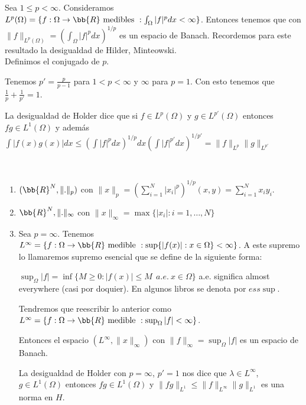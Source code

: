 \begin{ejemplo}
    Sea $1 \leq p < \infty$. Consideramos $L^p(\Omega) = \{f: \Omega \to \bb{R} \text{ medibles } : \int_\Omega |f|^p dx < \infty\}$. Entonces tenemos que con $\|f\|_{L^p(\Omega)} = (\int_\Omega |f|^p dx )^{1/p}$ es un espacio de Banach. Recordemos para este resultado la desigualdad de Hilder, Minteowski.\\

    Definimos el conjugado de $p$.

    Tenemos $p' = \frac{p}{p-1}$ para $1<p<\infty$ y $\infty$ para $p=1$. Con esto tenemos que $\frac{1}{p} + \frac{1}{p'} = 1$.

    La desigualdad de Holder dice que si $f\in L^p(\Omega)$ y $g \in L^{p'}(\Omega)$ entonces $fg \in L^1(\Omega)$ y además $\int |f(x)g(x)| dx \leq (\int |f|^p dx)^{1/p} dx (\int |f|^{p'} dx)^{1/{p'}} = \|f\|_{L^p} \|g\|_{L^{p'}}$
\end{ejemplo}

\begin{ejemplo}\ \\
    \begin{enumerate}
        \item $(\bb{R}^N, \|.\|_ p)$ con $\|x\|_p = (\sum_{i=1}^N |x_i|^p)^{1/p}(x,y) = \sum_{i=1}^N x_i y_i$.
        \item $\bb{R}^N, \|.\|_\infty$ con $\|x\|_\infty = \max \{|x_i|: i=1,\dots,N\}$
        \item Sea $p=\infty$. Tenemos $L^{\infty} = \{f:\Omega \to \bb{R} \text{ medible } : \sup\{|f(x)| : x\in \Omega\}< \infty\}$. A este supremo lo llamaremos supremo esencial que se define de la siguiente forma:
        
        $\sup_{\Omega}|f| = \inf \{M \geq 0 : |f(x)| \leq M \ \ a.e. \ x\in \Omega\}$ a.e. significa almost everywhere (casi por doquier). En algunos libros se denota por $ess\sup$.

        Tendremos que reescribir lo anterior como $L^{\infty} = \{f:\Omega \to \bb{R} \text{ medible } : \sup_\Omega |f|< \infty\}$.

        Entonces el espacio $(L^\infty, \|x\|_\infty)$ con $\|f\|_\infty = \sup_\Omega |f|$ es un espacio de Banach.

        La desigualdad de Holder con $p=\infty$, $p'=1$ nos dice que $\lambda \in L^\infty$, $g\in L^1(\Omega)$ entonces $fg \in L^1(\Omega)$ y $\|fg\|_{L^1}\leq \|f\|_{L^\infty} \|g\|_{L^{1}}$ es una norma en $H$.
    \end{enumerate}
\end{ejemplo}

